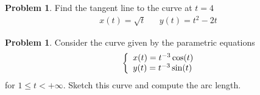 \documentclass[10pt]{article}
\theoremstyle{definition}
\newtheorem{problem}[theorem]{Problem}
\newcommand{\vt}{\vskip 5mm} %
\newcommand{\Fl}{\vt\noindent\textbf} %
\newcommand{\1}[1]{\textbf{1}_{\left[#1\right]}} %
\begin{document}
\begin{problem}
  Find the tangent line to the curve at $t=4$
  \begin{align*}
    x(t)=\sqrt{t}&&y(t)=t^2-2t
  \end{align*}
\end{problem}


\begin{problem}
  Consider the curve given by the parametric equations
  \begin{equation*}
    \left\{ \begin{array}{l@{}l} x(t) = t^{-3}\cos(t) \\
        y(t) = t^{-3}\sin( t) \end{array}\right.
  \end{equation*}
  for $1 \leq t <+\infty$. Sketch this curve and compute the arc length.
  

\end{problem}
\end{document}
